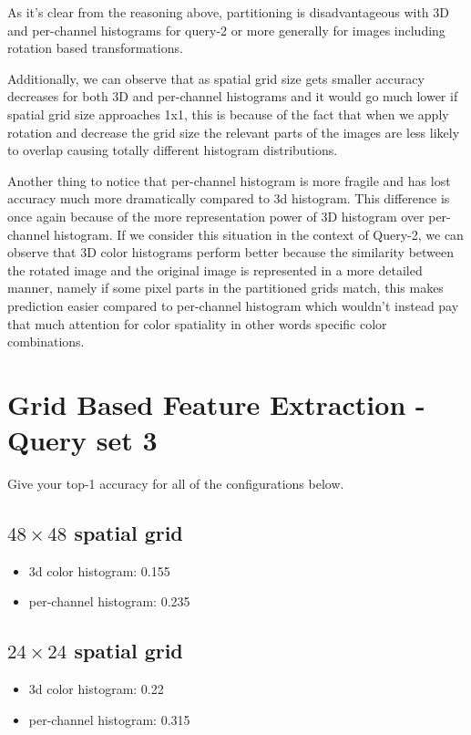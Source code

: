 \documentclass[12pt]{article}
\begin{document}
As it's clear from the reasoning above, partitioning is disadvantageous with 3D and per-channel histograms for query-2 or more generally for
images including rotation based transformations. 

Additionally, we can observe that as spatial grid size gets smaller accuracy decreases for both 3D and per-channel histograms and it would go much lower if spatial grid size approaches 1x1,
this is because of the fact that when we apply rotation and decrease the grid size the relevant parts of the images are less likely to overlap
causing totally different histogram distributions.

Another thing to notice that per-channel histogram is more fragile and has lost accuracy much more dramatically compared to 3d histogram. 
This difference is once again because of the more representation power of 3D histogram over per-channel histogram.
If we consider this situation in the context of Query-2, we can observe that 3D color histograms perform better
because the similarity between the rotated image and the original image is represented in a more detailed manner,
namely if some pixel parts in the partitioned grids match, this makes prediction easier compared to
per-channel histogram which wouldn't instead pay that much attention for color spatiality in other words specific color combinations.

\section{Grid Based Feature Extraction - Query set 3}
Give your top-1 accuracy for all of the configurations below.

\subsection{$48\times48$ spatial grid}
\begin{itemize}
\item 3d color histogram: 0.155
\item per-channel histogram: 0.235
\end{itemize}

\subsection{$24\times24$ spatial grid}
\begin{itemize}
\item 3d color histogram: 0.22
\item per-channel histogram: 0.315
\end{itemize}
\end{document}
